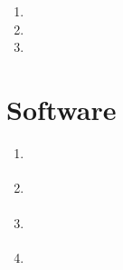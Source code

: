\documentclass[a4paper,10pt,english,oneside]{sphinxmanual}
\begin{document}
\begin{DUlineblock}{0em}
\item[] 
\end{DUlineblock}


\subsection{}
\label{\detokenize{applications/index:id9}}\begin{enumerate}
%
\item {} 
\sphinxAtStartPar
{}

\item {} 
\sphinxAtStartPar
{}

\item {} 
\sphinxAtStartPar
{}

\end{enumerate}

\sphinxstepscope


\chapter{Software}
\label{\detokenize{software/index:software}}\label{\detokenize{software/index::doc}}\begin{enumerate}
%
\item {} 
\sphinxAtStartPar
{\hyperref[\detokenize{software/index:open20}]{}}

\item {} 
\sphinxAtStartPar
{\hyperref[\detokenize{software/index:open21}]{}}

\item {} 
\sphinxAtStartPar
{\hyperref[\detokenize{software/index:open22}]{}}

\item {} 
\sphinxAtStartPar
{\hyperref[\detokenize{software/index:open23}]{}}

\end{enumerate}

\begin{DUlineblock}{0em}
\item[] 
\end{DUlineblock}
\end{document}
